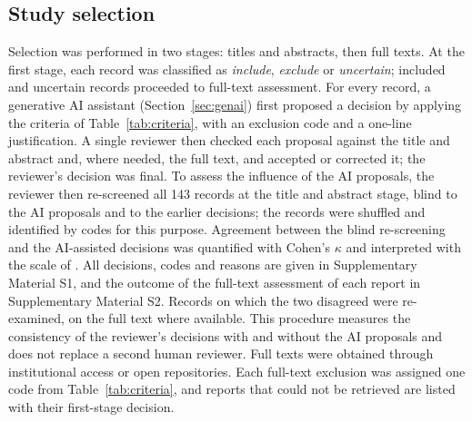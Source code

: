 \documentclass[preprint,12pt]{elsarticle}
\begin{document}
\subsection{Study selection}
Selection was performed in two stages: titles and abstracts, then full texts. At the first stage, each record was classified as \emph{include}, \emph{exclude} or \emph{uncertain}; included and uncertain records proceeded to full-text assessment. For every record, a generative AI assistant (Section~\ref{sec:genai}) first proposed a decision by applying the criteria of Table~\ref{tab:criteria}, with an exclusion code and a one-line justification. A single reviewer then checked each proposal against the title and abstract and, where needed, the full text, and accepted or corrected it; the reviewer's decision was final. To assess the influence of the AI proposals, the reviewer then re-screened all 143 records at the title and abstract stage, blind to the AI proposals and to the earlier decisions; the records were shuffled and identified by codes for this purpose. Agreement between the blind re-screening and the AI-assisted decisions was quantified with Cohen's $\kappa$ \citep{cohen1960kappa} and interpreted with the scale of \citet{landis1977kappa}. All decisions, codes and reasons are given in Supplementary Material S1, and the outcome of the full-text assessment of each report in Supplementary Material S2. Records on which the two disagreed were re-examined, on the full text where available. This procedure measures the consistency of the reviewer's decisions with and without the AI proposals and does not replace a second human reviewer. Full texts were obtained through institutional access or open repositories. Each full-text exclusion was assigned one code from Table~\ref{tab:criteria}, and reports that could not be retrieved are listed with their first-stage decision.
 
\end{document}
